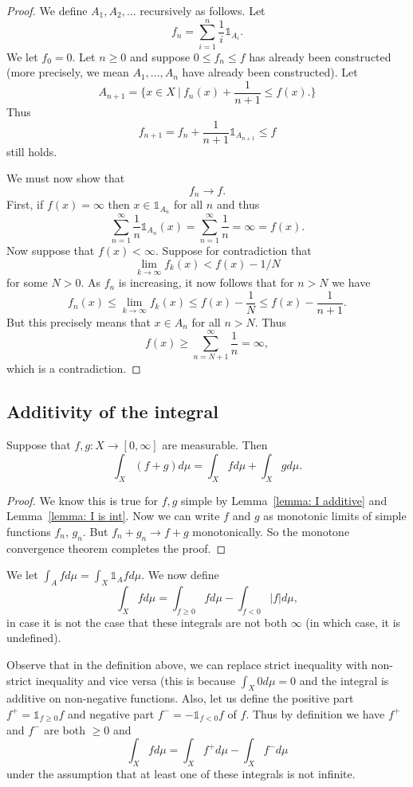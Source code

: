 \documentclass[twoside, a4paper, 10pt]{amsart}
\begin{document}
\begin{proof} We define $A_1,A_2,\ldots$ recursively as follows. Let $$f_n = \sum_{i=1}^n \frac{1}{i} \mathds{1}_{A_i}.$$ We let $f_0 = 0$. Let $n \geq 0$ and suppose $0 \leq f_n \leq f$ has already been constructed (more precisely, we mean $A_1,\ldots, A_n$ have already been constructed). Let $$A_{n+1} = \{ x \in X ~|~ f_n(x) + \frac{1}{n+1} \leq f(x).\}$$ Thus $$f_{n+1} = f_n + \frac{1}{n+1} \mathds{1}_{A_{n+1}} \leq f$$ still holds.

We must now show that $$f_n \to f.$$ First, if $f(x) = \infty$ then $x \in \mathds{1}_{A_n}$ for all $n$ and thus $$\sum_{n=1}^{\infty} \frac{1}{n}\mathds{1}_{A_n}(x) = \sum_{n=1}^{\infty} \frac{1}{n} = \infty = f(x).$$
Now suppose that $f(x) < \infty$. Suppose for contradiction that $$\lim_{k \to \infty} f_k(x) < f(x) - 1/N$$ for some $N>0$. As $f_n$ is increasing, it now follows that for $n>N$ we have $$f_n(x) \leq \lim_{k \to \infty} f_k(x) \leq f(x) - \frac{1}{N} \leq f(x) - \frac{1}{n+1}.$$ But this precisely means that $x \in A_n$ for all $n>N$. Thus $$f(x) \geq \sum_{n=N+1}^{\infty}\frac{1}{n} = \infty,$$ which is a contradiction. \end{proof}

\subsection{Additivity of the integral}
\begin{thm}\label{thm: int additive for positive} Suppose that $f,g:X \to [0,\infty]$ are measurable. Then $$\int_X (f+g)d\mu = \int_X f d\mu + \int_X g d\mu.$$
\end{thm}

\begin{proof} We know this is true for $f,g$ simple by Lemma~\ref{lemma: I additive} and Lemma~\ref{lemma: I is int}. Now we can write $f$ and $g$ as monotonic limits of simple functions $f_n$, $g_n$. But $f_n + g_n \to f+g$ monotonically. So the monotone convergence theorem completes the proof. \end{proof}

\begin{mydef} We let $\int_A f d\mu = \int_X \mathds{1}_A f d\mu$. We now define $$\int_{X} f d\mu = \int_{f \geq 0} f d\mu - \int_{f < 0} |f| d\mu,$$ in case it is not the case that these integrals are not both $\infty$ (in which case, it is undefined).
\end{mydef}

Observe that in the definition above, we can replace strict inequality with non-strict inequality and vice versa (this is because $\int_X 0 d\mu = 0$ and the integral is additive on non-negative functions.
Also, let us define the positive part $f^+ = \mathds{1}_{f \geq 0} f$ and negative part $f^- = -\mathds{1}_{f < 0}f$ of $f$. Thus by definition we have $f^+$ and $f^-$ are both $\geq 0$ and $$\int_X f d\mu = \int_X f^+ d\mu - \int_X f^- d\mu$$ under the assumption that at least one of these integrals is not infinite.
\end{document}
